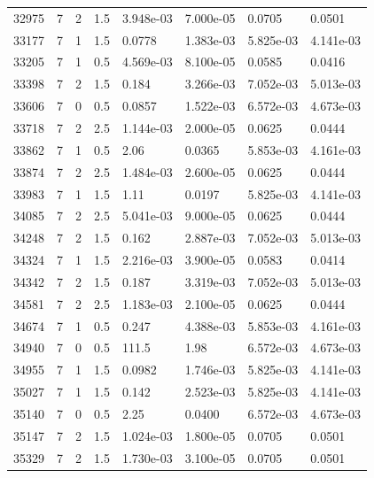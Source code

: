 \documentclass[preview]{standalone}
\begin{document}
{{{{{{\begin{tabular}{L{1.2cm}C{1.2cm} C{0.3cm}C{0.5cm} C{1.4cm}C{1.4cm} C{1.4cm}C{1.4cm}}
  32975  &     7  & 2     & 1.5 &  3.948e-03  & 7.000e-05  & 0.0705 &  0.0501   \\ 
  33177  &     7  & 1     & 1.5 &  0.0778  & 1.383e-03  & 5.825e-03 &  4.141e-03   \\ 
  33205  &     7  & 1     & 0.5 &  4.569e-03  & 8.100e-05  & 0.0585 &  0.0416   \\ 
  33398  &     7  & 2     & 1.5 &  0.184  & 3.266e-03  & 7.052e-03 &  5.013e-03   \\ 
  33606  &     7  & 0     & 0.5 &  0.0857  & 1.522e-03  & 6.572e-03 &  4.673e-03   \\ 
  33718  &     7  & 2     & 2.5 &  1.144e-03  & 2.000e-05  & 0.0625 &  0.0444   \\ 
  33862  &     7  & 1     & 0.5 &  2.06  & 0.0365  & 5.853e-03 &  4.161e-03   \\ 
  33874  &     7  & 2     & 2.5 &  1.484e-03  & 2.600e-05  & 0.0625 &  0.0444   \\ 
  33983  &     7  & 1     & 1.5 &  1.11  & 0.0197  & 5.825e-03 &  4.141e-03   \\ 
  34085  &     7  & 2     & 2.5 &  5.041e-03  & 9.000e-05  & 0.0625 &  0.0444   \\ 
  34248  &     7  & 2     & 1.5 &  0.162  & 2.887e-03  & 7.052e-03 &  5.013e-03   \\ 
  34324  &     7  & 1     & 1.5 &  2.216e-03  & 3.900e-05  & 0.0583 &  0.0414   \\ 
  34342  &     7  & 2     & 1.5 &  0.187  & 3.319e-03  & 7.052e-03 &  5.013e-03   \\ 
  34581  &     7  & 2     & 2.5 &  1.183e-03  & 2.100e-05  & 0.0625 &  0.0444   \\ 
  34674  &     7  & 1     & 0.5 &  0.247  & 4.388e-03  & 5.853e-03 &  4.161e-03   \\ 
  34940  &     7  & 0     & 0.5 &  111.5  & 1.98  & 6.572e-03 &  4.673e-03   \\ 
  34955  &     7  & 1     & 1.5 &  0.0982  & 1.746e-03  & 5.825e-03 &  4.141e-03   \\ 
  35027  &     7  & 1     & 1.5 &  0.142  & 2.523e-03  & 5.825e-03 &  4.141e-03   \\ 
  35140  &     7  & 0     & 0.5 &  2.25  & 0.0400  & 6.572e-03 &  4.673e-03   \\ 
  35147  &     7  & 2     & 1.5 &  1.024e-03  & 1.800e-05  & 0.0705 &  0.0501   \\ 
  35329  &     7  & 2     & 1.5 &  1.730e-03  & 3.100e-05  & 0.0705 &  0.0501   \\ 

\end{tabular}}}}}}}
\end{document}
